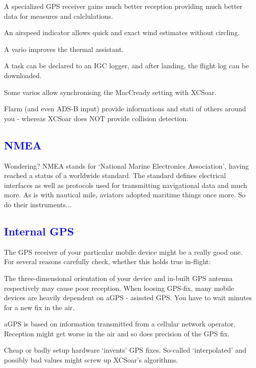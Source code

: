 \documentclass[english,a4paper,12pt,utf8]{scrreprt}
\newcommand{\xc}{{\textsf XCSoar}}
\begin{document}
\begin{compactitem}
\item A specialized GPS receiver gains much better reception providing much 
better data for measures and calclulations.
\item An airspeed indicator allows quick and exact wind estimates without 
circling.
\item A vario improves the thermal assistant.
\item A task can be declared to an IGC logger, and after landing, the 
flight log can be downloaded.
\item Some varios allow synchronising the MacCready setting with XCSoar.
\item Flarm (and even ADS-B input) provide informations and stati of others 
around you - whereas \xc{} does NOT provide collision detection.
\end{compactitem}

\subsection*{\textcolor{blue}{NMEA}}
Wondering?  NMEA stands for `National Marine Electronics Association', having 
reached a status of a worldwide standard. The standard defines electrical 
interfaces as well as protocols used for transmitting navigational data and 
much more. As is with nautical mile, aviators adopted maritime things once 
more. So do their instruments...

\subsection*{\textcolor{blue}{Internal GPS}}
The GPS receiver of your particular mobile device might be a really good one. 
For several reasons carefully check, whether this holds true in-flight:

\begin{compactitem}
\item The three-dimensional orientation of your device and in-built GPS 
antenna respectively may cause poor reception.  When loosing GPS-fix, many 
mobile devices are heavily dependent on aGPS - asissted GPS.  You have to wait 
minutes for a new fix in the air.
\item aGPS is based on information transmitted from a cellular network 
operator. Reception might get worse in the air and so does precision of the 
GPS fix.
\item Cheap or badly setup hardware `invents' GPS fixes. So-called 
`interpolated' and possibly bad values might screw up XCSoar's algorithms.
\end{compactitem}
\end{document}
